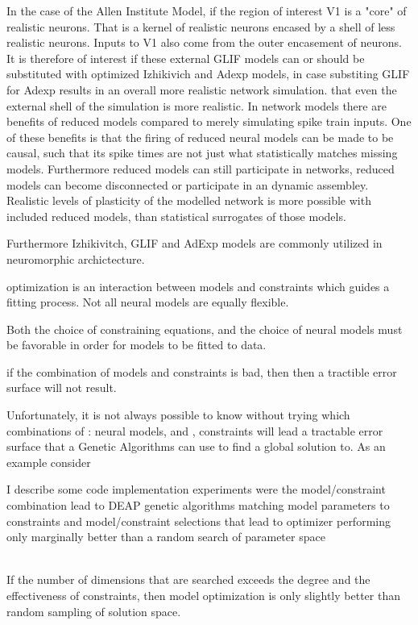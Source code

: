 \documentclass{article}
\begin{document}
In the case of the Allen Institute Model, if the region of interest V1 is a "core" of realistic neurons. That is a kernel of realistic neurons encased by a shell of less realistic neurons. Inputs to V1 also come from the outer encasement of neurons. It is therefore of interest if these external GLIF models can or should be substituted with optimized Izhikivich and Adexp models, in case substiting GLIF for Adexp results in an overall more realistic network simulation. that even the external shell of the simulation is more realistic. In network models there are benefits of reduced models compared to merely simulating spike train inputs. One of these benefits is that the firing of reduced neural models can be made to be causal, such that its spike times are not just what statistically matches missing models. Furthermore reduced models can still participate in networks, reduced models can become disconnected or participate in an dynamic assembley. Realistic levels of plasticity of the modelled network is more possible with included reduced models, than statistical surrogates of those models.

Furthermore Izhikivitch, GLIF and AdExp models are commonly utilized in neuromorphic archictecture.

\subitem optimization is an interaction between models and constraints which guides a fitting process. Not all neural models are equally flexible.  
\item  Both the choice of constraining equations, and the choice of neural models must be favorable in order for models to be fitted to data.
\item 
\subitem if the combination of models and constraints is bad, then then a tractible error surface will not result.  

\subsubitem Unfortunately, it is not always possible to know without trying which combinations of \subitem[A]: neural models, and \subitem[B], constraints will lead a tractable error surface that a Genetic Algorithms can use to find a global solution to. As an example consider  

I describe some code implementation experiments were the model/constraint combination lead to DEAP genetic algorithms matching model parameters to constraints and model/constraint selections that lead to optimizer performing only marginally better than a random search of parameter space\\
\\
\item If the number of dimensions that are searched exceeds the degree and the effectiveness of constraints, then model optimization is only slightly better than random sampling of solution space.
\end{document}

